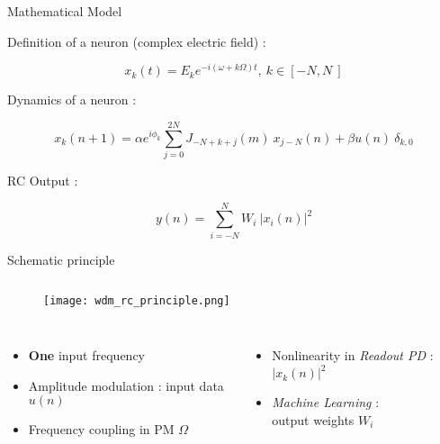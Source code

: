 \begin{frame}{Mathematical Model}

	Definition of a neuron (complex electric field) :
	
	\begin{equation}
		x_k(t)=E_k e^{-i(\omega+k \Omega)t},~ k \in [-N,N~]
	\end{equation}
	
	Dynamics of a neuron :
	
	\begin{equation}
		x_k(n+1)= \alpha e^{i\phi_k}\sum_{j=0}^{2N} J_{-N+k+j}(m) ~x_{j-N}(n) + \beta u(n)~ \delta_{k,0}
		\label{neuron_dynamics}
	\end{equation}
	
	RC Output :
	
	\begin{equation}
		y(n)=\sum_{i=-N}^{N} W_i ~|x_i(n)|^2
	\end{equation}
	
\end{frame}


\begin{frame}{Schematic principle}

	\begin{figure}
		\begin{columns}
			\texttt{[image: wdm\_rc\_principle.png]}
			\caption{\cite{AkroutAkram2016Pprc}}
		\end{columns}
	\end{figure}
	
	\begin{columns}
		\begin{column}{0.5\textwidth}
			\begin{itemize}
				\item \textbf{One} input frequency
				\item Amplitude modulation : input data $u(n)$
				\item Frequency coupling in PM $\Omega$
			\end{itemize}
		\end{column}
		\begin{column}{0.5\textwidth}
			\begin{itemize}
				\item Nonlinearity in \emph{Readout PD} : $|x_k(n)|^2$
				\item \textit{Machine Learning} : \\output weights $W_i$
			\end{itemize}
		\end{column}
	\end{columns}
\end{frame}

